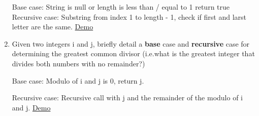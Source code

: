 \documentclass[addpoints]{exam}
\begin{document}
\begin{enumerate}
\begin{oneparchoices} 
\hspace{0.2cm}
\vspace{1em}
 \choice Base case: \newline \Ans String is null or length is less than / equal to 1 return true\newline \newline
 \vspace{1em}
 \choice Recursive case: \newline \Ans Substring from index 1 to length - 1, check if first and larst letter are the same.\newline \newline
 \Ans \href{http://cscircles.cemc.uwaterloo.ca/java_visualize/#code=/*%0A+*+Andrew+Blejde%0A+*+Palindrome+Check+w/+Recursion%0A+*+CS180+Week+15%0A+*/%0A%0Apublic+class+Palindrome%0A%7B%0A%0A++++public+static+boolean+isPalindrome(String+s)%0A++++%7B%0A++++++++if(s.length()+%3D%3D+0+%7C%7C+s.length()+%3D%3D+1)%0A++++++++++++return+true%3B+%0A++++++++if(s.charAt(0)+%3D%3D+s.charAt(s.length()-1))%0A++++++++++++return+isPalindrome(s.substring(1,+s.length()-1))%3B%0A%0A++++++++return+false%3B%0A++++%7D%0A%0A++++public+static+void+main(String%5B%5Dargs)%0A++++%7B%0A++++++++if(isPalindrome(%22racecar%22))%0A++++++++++++System.out.println(%22Is+a+palindrome%22)%3B%0A++++++++else%0A++++++++++++System.out.println(%22Is+not+a+palindrome%22)%3B%0A++++%7D%0A%7D&mode=edit}{Demo}
 \end{oneparchoices}


 \item {}
Given two integers i and j, briefly detail a \textbf{base} case and \textbf{recursive} case for determining the greatest common divisor (i.e.what is the greatest integer that divides both numbers with no remainder?)

\begin{oneparchoices} 
\hspace{0.2cm}
\vspace{2em}
 \choice Base case:  \Ans Modulo of i and j is 0, return j.

 \vspace{1em}\newline
 \choice Recursive case:  \Ans Recursive call with j and the remainder of the modulo of i and j.
 \newline \newline
\Ans \href{http://cscircles.cemc.uwaterloo.ca/java_visualize/#code=/*%0A+*+Andrew+Blejde%0A+*+CS180+Week+15%0A+*+GCD+with+Recursion%0A+*/%0Apublic+class+gcd%0A%7B%0A%09public+static+int+gcdCalc(int+a,+int+b)%0A%09%7B%0A%09%09if(b+%3D%3D+0)%0A%09%09%09return+a%3B%0A%09%09else%0A%09%09%09return+gcdCalc(b,+a+%25+b)%3B%0A%09%7D%0A%09public+static+void+main(String%5B%5D+args)%0A%09%7B%0A%09%09System.out.println(%22GCD%3A+%22+%2B+gcdCalc(124,+48))%3B%0A%09%7D%0A%7D&mode=}{Demo}
 \end{oneparchoices}
 

\end{enumerate}
\end{document}

